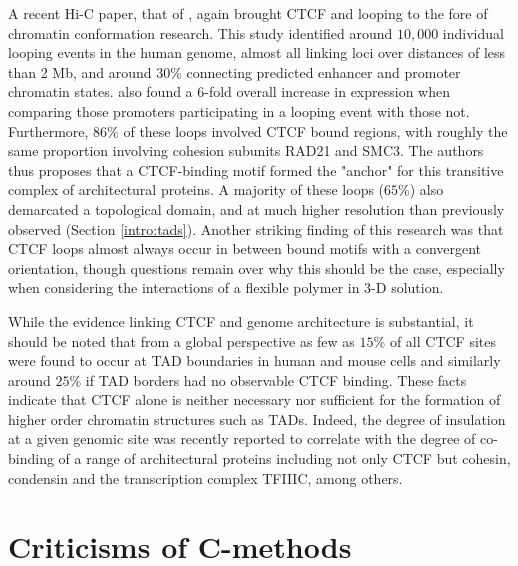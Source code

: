 \documentclass[a4paper,11pt,oneside]{book}
\begin{document}
A recent Hi-C paper, that of \citet{Rao2014}, again brought CTCF and looping to the fore of chromatin conformation research. This study identified around $10,000$ individual looping events in the human genome, almost all linking loci over distances of less than 2 Mb, and around $30\%$ connecting predicted enhancer and promoter chromatin states. \citet{Rao2014} also found a 6-fold overall increase in expression when comparing those promoters participating in a looping event with those not. Furthermore, $86\%$ of these loops involved CTCF bound regions, with roughly the same proportion involving cohesion subunits RAD21 and SMC3. The authors thus proposes that a CTCF-binding motif formed the "anchor" for this transitive complex of architectural proteins.\cite{Rao2014} A majority of these loops ($65\%$) also demarcated a topological domain, and at much higher resolution than previously observed (Section \ref{intro:tads}). Another striking finding of this research was that CTCF loops almost always occur in between bound motifs with a convergent orientation,\cite{Rao2014} though questions remain over why this should be the case, especially when considering the interactions of a flexible polymer in 3-D solution.

While the evidence linking CTCF and genome architecture is substantial, it should be noted that from a global perspective as few as $15\%$ of all CTCF sites were found to occur at TAD boundaries in human and mouse cells\cite{Dixon2012} and similarly around $25\%$ if TAD borders had no observable CTCF binding.\cite{Sexton2015} These facts indicate that CTCF alone is neither necessary nor sufficient for the formation of higher order chromatin structures such as TADs. Indeed, the degree of insulation at a given genomic site was recently reported to correlate with the degree of co-binding of a range of architectural proteins including not only CTCF but cohesin, condensin and the transcription complex TFIIIC, among others.\cite{VanBortle2014}

%

\section{Criticisms of C-methods}
\end{document}
